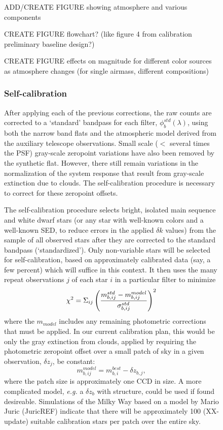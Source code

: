 \documentclass[12pt,preprint]{aastex}
\begin{document}
\begin{figure}[htbp]
{ADD/CREATE FIGURE showing atmosphere and various components

CREATE FIGURE flowchart? (like figure 4 from calibration preliminary
baseline design?)

CREATE FIGURE effects on magnitude for different color sources as
atmosphere changes (for single airmass, different compositions)

\subsubsection{Self-calibration}
\label{sec:selfcalib}

After applying each of the previous corrections, the raw counts are
corrected to a `standard' bandpass for each filter,
$\phi_b^{std}(\lambda)$, using both the narrow band flats and the
atmospheric model derived from the auxiliary telescope
observations. Small scale ($<$ several times the PSF) gray-scale
zeropoint variations have also been removed by the synthetic
flat. However, there still remain variations in the normalization of the
system response that result from gray-scale extinction due to
clouds. The self-calibration procedure is necessary to correct for
these zeropoint offsets.

The self-calibration procedure selects bright, isolated main sequence
and white dwarf stars (or any star with well-known colors and a
well-known SED, to reduce errors in the applied
$\delta k$ values) from the sample of all observed stars after they are
corrected to the standard bandpass (`standardized'). Only non-variable stars will be
selected for self-calibration, based on approximately calibrated data
(say, a few percent) which will suffice in this context. It then uses
the many repeat observations $j$ of each star $i$ in a particular filter to minimize
\begin{equation}
\label{eqn:selfcalmin}
\chi^2 = \Sigma_{ij} \left(  { m_{b,ij}^{std} - m_{b,ij}^{model} \over
    \sigma_{b,ij}^{std} } \right)^2
\end{equation}
where the $m_{model}$ includes any remaining photometric corrections
that must be applied. In our current calibration plan, this would be only the
gray extinction from clouds, applied by requiring the photometric
zeropoint offset over a small patch of sky in a given observation, $\delta z_j$, be constant:
\begin{equation}
\label{eqn:zp}
m^{model}_{b,ij} = m^{best}_{b,i} - \delta z_{b,j},
\end{equation}
where the patch size is approximately one CCD in size. A more
complicated model, {\it e.g.} a $\delta z_{b}$ with structure, could
be used if found desireable. Simulations of the Milky Way based on a
model by Mario Juric (JuricREF) indicate that there will be
approximately 100 (XX-update)
suitable calibration stars per patch over the entire sky. 

}
\end{figure}
\end{document}
